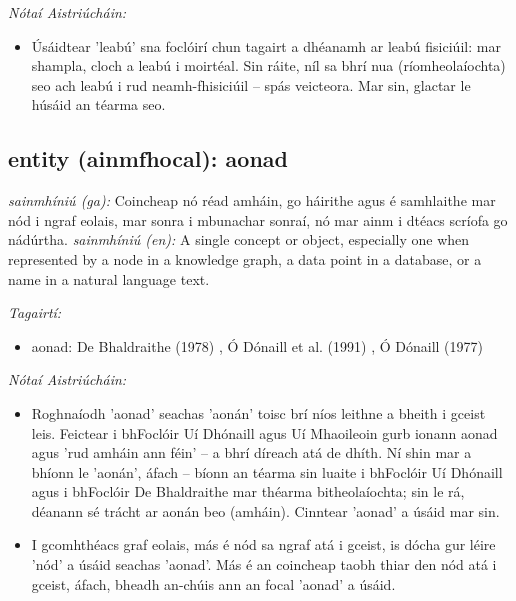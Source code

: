 \documentclass{article}
\begin{document}
 \noindent \textit{Nótaí Aistriúcháin:}
\begin{itemize}
	\item Úsáidtear 'leabú' sna foclóirí chun tagairt a dhéanamh ar leabú fisiciúil: mar shampla, cloch a leabú i moirtéal. Sin ráite, níl sa bhrí nua (ríomheolaíochta) seo ach leabú i rud neamh-fhisiciúil -- spás veicteora. Mar sin, glactar le húsáid an téarma seo.
\end{itemize}


\subsection*{entity (ainmfhocal): aonad} 
 \noindent \textit{sainmhíniú (ga):} Coincheap nó réad amháin, go háirithe agus é samhlaithe mar nód i ngraf eolais, mar sonra i mbunachar sonraí, nó mar ainm i dtéacs scríofa go nádúrtha.
\newline\newline
 \noindent \textit{sainmhíniú (en):} A single concept or object, especially one when represented by a node in a knowledge graph, a data point in a database, or a name in a natural language text.
\newline

 \noindent \textit{Tagairtí:}
\begin{itemize}
	\item aonad: De Bhaldraithe (1978) \cite{de-bhaldraithe}, Ó Dónaill et al. (1991) \cite{focloir-beag}, Ó Dónaill (1977) \cite{odonaill}
\end{itemize}

 \noindent \textit{Nótaí Aistriúcháin:}
\begin{itemize}
	\item Roghnaíodh 'aonad' seachas 'aonán' toisc brí níos leithne a bheith i gceist leis. Feictear i bhFoclóir Uí Dhónaill agus Uí Mhaoileoin gurb ionann aonad agus 'rud amháin ann féin' -- a bhrí díreach atá de dhíth. Ní shin mar a bhíonn le 'aonán', áfach -- bíonn an téarma sin luaite i bhFoclóir Uí Dhónaill agus i bhFoclóir De Bhaldraithe mar théarma bitheolaíochta; sin le rá, déanann sé trácht ar aonán beo (amháin). Cinntear 'aonad' a úsáid mar sin.
	\item I gcomhthéacs graf eolais, más é nód sa ngraf atá i gceist, is dócha gur léire 'nód' a úsáid seachas 'aonad'. Más é an coincheap taobh thiar den nód atá i gceist, áfach, bheadh an-chúis ann an focal 'aonad' a úsáid.
\end{itemize}
\end{document}
